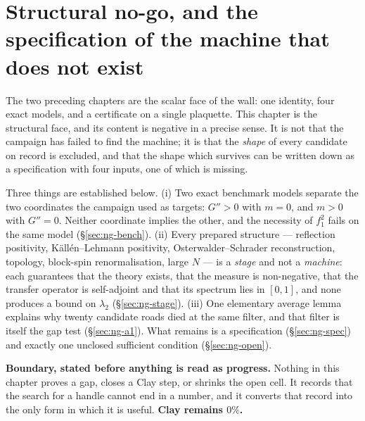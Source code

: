 \let\codeprev\code
\renewcommand{\code}[1]{\texttt{\footnotesize\detokenize{#1}}}

\section{Structural no-go, and the specification of the machine that does not exist}
\label{ch:nogo-spec}

The two preceding chapters are the scalar face of the wall: one identity, four exact models, and a
certificate on a single plaquette. This chapter is the structural face, and its content is negative
in a precise sense. It is not that the campaign has failed to find the machine; it is that the
\emph{shape} of every candidate on record is excluded, and that the shape which survives can be
written down as a specification with four inputs, one of which is missing.

Three things are established below. (i) Two exact benchmark models separate the two coordinates the
campaign used as targets: $G''>0$ with $m=0$, and $m>0$ with $G''=0$. Neither coordinate implies
the other, and the necessity of $f_1^2$ fails on the same model (\S\ref{sec:ng-bench}). (ii) Every
prepared structure --- reflection positivity, K\"all\'en--Lehmann positivity, Osterwalder--Schrader
reconstruction, topology, block-spin renormalisation, large $N$ --- is a \emph{stage} and not a
\emph{machine}: each guarantees that the theory exists, that the measure is non-negative, that the
transfer operator is self-adjoint and that its spectrum lies in $[0,1]$, and none produces a bound
on $\lambda_2$ (\S\ref{sec:ng-stage}). (iii) One elementary average lemma explains why twenty
candidate roads died at the same filter, and that filter is itself the gap test
(\S\ref{sec:ng-a1}). What remains is a specification (\S\ref{sec:ng-spec}) and exactly one
unclosed sufficient condition (\S\ref{sec:ng-open}).

\textbf{Boundary, stated before anything is read as progress.} Nothing in this chapter proves a gap,
closes a Clay step, or shrinks the open cell. It records that the search for a handle cannot end in
a number, and it converts that record into the only form in which it is useful. \textbf{Clay
remains $0\%$.}

